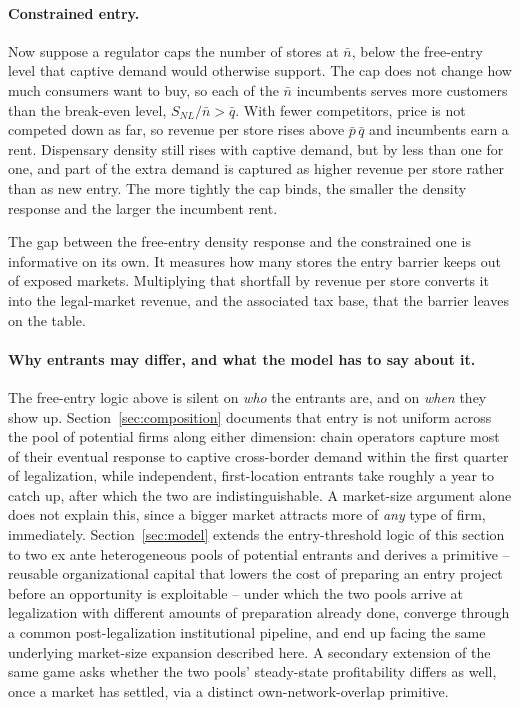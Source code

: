 \documentclass[english,12pt]{article}
\begin{document}
\paragraph{Constrained entry.} Now suppose a regulator caps the number of stores at $\bar n$, below the free-entry level that captive demand would otherwise support. The cap does not change how much consumers want to buy, so each of the $\bar n$ incumbents serves more customers than the break-even level, $S_{NL} / \bar n > \bar q$. With fewer competitors, price is not competed down as far, so revenue per store rises above $\bar p\,\bar q$ and incumbents earn a rent. Dispensary density still rises with captive demand, but by less than one for one, and part of the extra demand is captured as higher revenue per store rather than as new entry. The more tightly the cap binds, the smaller the density response and the larger the incumbent rent.

The gap between the free-entry density response and the constrained one is informative on its own. It measures how many stores the entry barrier keeps out of exposed markets. Multiplying that shortfall by revenue per store converts it into the legal-market revenue, and the associated tax base, that the barrier leaves on the table.

\paragraph{Why entrants may differ, and what the model has to say about it.} The free-entry logic above is silent on \emph{who} the entrants are, and on \emph{when} they show up. Section~\ref{sec:composition} documents that entry is not uniform across the pool of potential firms along either dimension: chain operators capture most of their eventual response to captive cross-border demand within the first quarter of legalization, while independent, first-location entrants take roughly a year to catch up, after which the two are indistinguishable. A market-size argument alone does not explain this, since a bigger market attracts more of \emph{any} type of firm, immediately. Section~\ref{sec:model} extends the entry-threshold logic of this section to two ex ante heterogeneous pools of potential entrants and derives a primitive -- reusable organizational capital that lowers the cost of preparing an entry project before an opportunity is exploitable -- under which the two pools arrive at legalization with different amounts of preparation already done, converge through a common post-legalization institutional pipeline, and end up facing the same underlying market-size expansion described here. A secondary extension of the same game asks whether the two pools' steady-state profitability differs as well, once a market has settled, via a distinct own-network-overlap primitive.
\end{document}
